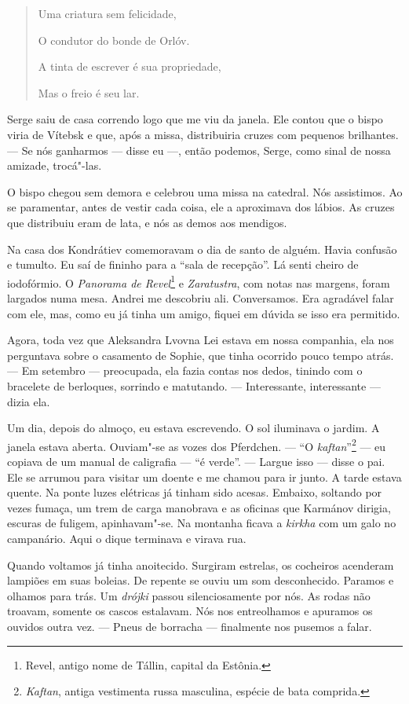 \begin{quotation}
Uma criatura sem felicidade,

O condutor do bonde de Orlóv.

A tinta de escrever é sua propriedade,

Mas o freio é seu lar.
\end{quotation}

Serge saiu de casa correndo logo que me viu da janela. Ele contou que o
bispo viria de Vítebsk e que, após a missa, distribuiria cruzes com
pequenos brilhantes. --- Se nós ganharmos --- disse eu ---, então
podemos, Serge, como sinal de nossa amizade, trocá"-las.

O bispo chegou sem demora e celebrou uma missa na catedral. Nós
assistimos. Ao se paramentar, antes de vestir cada coisa, ele a
aproximava dos lábios. As cruzes que distribuiu eram de lata, e nós as
demos aos mendigos.

Na casa dos Kondrátiev comemoravam o dia de santo de alguém. Havia
confusão e tumulto. Eu saí de fininho para a ``sala de recepção''. Lá
senti cheiro de iodofórmio. O \emph{Panorama de Revel}\footnote{Revel,
  antigo nome de Tállin, capital da Estônia.} e \emph{Zaratustra}, com
notas nas margens, foram largados numa mesa. Andrei me descobriu ali.
Conversamos. Era agradável falar com ele, mas, como eu já tinha um
amigo, fiquei em dúvida se isso era permitido.

Agora, toda vez que Aleksandra Lvovna Lei estava em nossa companhia, ela
nos perguntava sobre o casamento de Sophie, que tinha ocorrido pouco
tempo atrás. --- Em setembro --- preocupada, ela fazia contas nos dedos,
tinindo com o bracelete de berloques, sorrindo e matutando. ---
Interessante, interessante --- dizia ela.

Um dia, depois do almoço, eu estava escrevendo. O sol iluminava o
jardim. A janela estava aberta. Ouviam"-se as vozes dos Pferdchen. ---
``O \emph{kaftan}''\footnote{\emph{Kaftan}, antiga vestimenta russa
  masculina, espécie de bata comprida.} --- eu copiava de um manual de
caligrafia --- ``é verde''. --- Largue isso --- disse o pai. Ele se
arrumou para visitar um doente e me chamou para ir junto. A tarde estava
quente. Na ponte luzes elétricas já tinham sido acesas. Embaixo,
soltando por vezes fumaça, um trem de carga manobrava e as oficinas que
Karmánov dirigia, escuras de fuligem, apinhavam"-se. Na montanha ficava a
\emph{kirkha} com um galo no campanário. Aqui o dique terminava e virava
rua.

Quando voltamos já tinha anoitecido. Surgiram estrelas, os cocheiros
acenderam lampiões em suas boleias. De repente se ouviu um som
desconhecido. Paramos e olhamos para trás. Um \emph{drójki} passou
silenciosamente por nós. As rodas não troavam, somente os cascos
estalavam. Nós nos entreolhamos e apuramos os ouvidos outra vez. ---
Pneus de borracha --- finalmente nos pusemos a falar.

